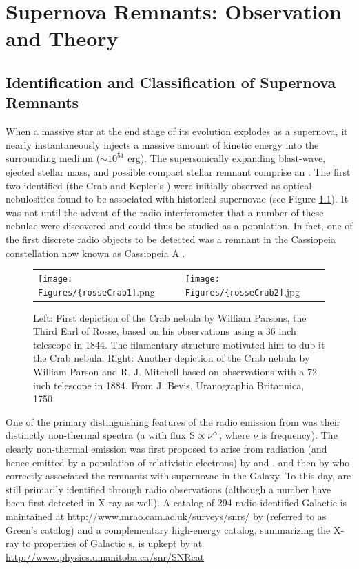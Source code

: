 \chapter{Supernova Remnants: Observation and Theory}\label{chap:Rems}

\section{Identification and Classification of Supernova Remnants}\label{Rems:intro}
When a massive star at the end stage of its evolution explodes as a supernova, it nearly instantaneously injects a massive amount of kinetic energy into the surrounding medium ($\sim 10^{51}$ erg). The supersonically expanding blast-wave, ejected stellar mass, and possible compact stellar remnant comprise an \snr{}. The first two identified \snrs{} (the Crab and Kepler's \snr{}) were initially observed as optical nebulosities found to be associated with historical supernovae (see Figure \ref{fig:Crab}). It was not until the advent of the radio interferometer that a number of these nebulae were discovered and could thus be studied as a population.  In fact, one of the first discrete radio objects to be detected was a remnant in the Cassiopeia constellation now known as Cassiopeia A \citep{Ryle48}.

\begin{figure}[h!]
	\begin{center}
		\begin{tabular}{ll}
			\texttt{[image: Figures/\{rosseCrab1]}.png} &
			\texttt{[image: Figures/\{rosseCrab2]}.jpg} \\
		\end{tabular}
	\end{center}
	\caption[Historical Crab nebula drawings]{
		\label{fig:Crab}{Left: First depiction of the Crab nebula by William Parsons, the Third Earl of Rosse,  based on his observations using a 36 inch telescope in 1844. The filamentary structure motivated him to dub it the Crab nebula. Right: Another depiction of the Crab nebula  by William Parson and R. J. Mitchell based on observations with a 72 inch telescope in 1884. From J. Bevis, Uranographia Britannica, 1750}
	}
\end{figure}
One of the primary distinguishing features of the radio emission from \snrs{} was their distinctly non-thermal spectra (a \pl{} with flux  ${\rm S \propto \nu^\alpha}$, where $\nu$ is frequency). The clearly non-thermal emission was first proposed to arise from \sync{} radiation (and hence emitted by a population of relativistic electrons) by \cite{Kiepenheuer50} and \cite{Alfven50}, and then by \cite{Shklovskii53} who correctly associated the remnants with supernovae in the Galaxy. To this day, \snrs{} are still primarily identified through radio observations (although a number have been first detected in X-ray as well). A catalog of 294 radio-identified Galactic \snrs{} is maintained at \url{http://www.mrao.cam.ac.uk/surveys/snrs/} by \cite{Green14} (referred to as Green's catalog) and a complementary high-energy catalog, summarizing the X-ray to \gam{} properties of Galactic \snr{}s, is upkept by \cite{Ferrand12} at \url{http://www.physics.umanitoba.ca/snr/SNRcat}

